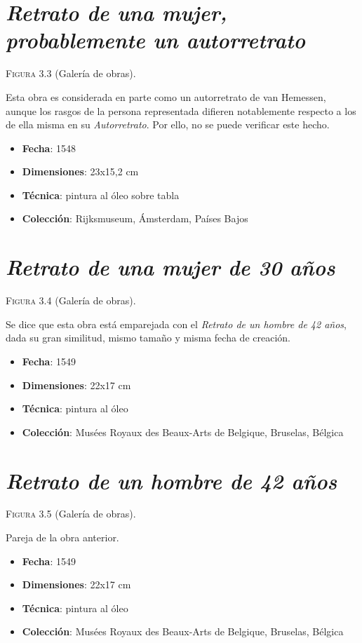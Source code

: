 \documentclass[12pt]{book}
\begin{document}
\section{\textit{Retrato de una mujer, probablemente un autorretrato}}

\textsc{Figura 3.3} (Galería de obras).\bigskip

Esta obra es considerada en parte como un autorretrato de van Hemessen, aunque los rasgos de la persona representada difieren notablemente respecto a los de ella misma en su \textit{Autorretrato}. Por ello, no se puede verificar este hecho.
\begin{itemize}
	\item \textbf{Fecha}: 1548
	\item \textbf{Dimensiones}: 23x15,2 cm
	\item \textbf{Técnica}: pintura al óleo sobre tabla
	\item \textbf{Colección}: Rijksmuseum, Ámsterdam, Países Bajos
\end{itemize}

\section{\textit{Retrato de una mujer de 30 años}}

\textsc{Figura 3.4} (Galería de obras).\bigskip

Se dice que esta obra está emparejada con el \textit{Retrato de un hombre de 42 años}, dada su gran similitud, mismo tamaño y misma fecha de creación.
\begin{itemize}
	\item \textbf{Fecha}: 1549
	\item \textbf{Dimensiones}: 22x17 cm
	\item \textbf{Técnica}: pintura al óleo
	\item \textbf{Colección}: Musées Royaux des Beaux-Arts de Belgique, Bruselas, Bélgica
\end{itemize}

\section{\textit{Retrato de un hombre de 42 años}}

\textsc{Figura 3.5} (Galería de obras).\bigskip

Pareja de la obra anterior.
\begin{itemize}
	\item \textbf{Fecha}: 1549
	\item \textbf{Dimensiones}: 22x17 cm
	\item \textbf{Técnica}: pintura al óleo
	\item \textbf{Colección}: Musées Royaux des Beaux-Arts de Belgique, Bruselas, Bélgica
\end{itemize}
\end{document}

